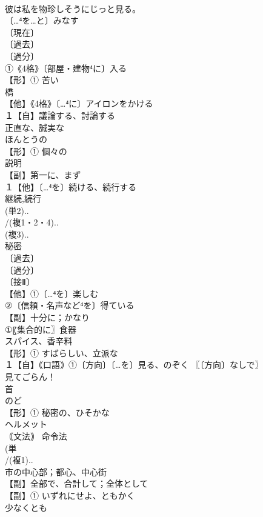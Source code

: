 \documentclass[8pt]{extreport}
\begin{document}
\begin{CJK}{UTF8}{min}
\\	彼は私を物珍しそうにじっと見る。 
\\	〔…⁴を…と〕みなす 
\\	〔現在〕
\\	〔過去〕
\\	〔過分〕
\\	①《4格》〔部屋・建物⁴に〕入る
\\	【形】① 苦い 
\\	橋 
\\	【他】《4格》〔…⁴に〕アイロンをかける 
\\	１【自】議論する、討論する 
\\	正直な、誠実な 
\\	ほんとうの
\\	【形】① 個々の 
\\	説明 
\\	【副】第一に、まず
\\	１【他】〔…⁴を〕続ける、続行する 
\\	継続,続行
\\	(単2)..
\\	/(複1・2・4)..
\\	(複3)..
\\	秘密 
\\	〔過去〕
\\	〔過分〕
\\	〔接Ⅱ〕
\\	【他】①〔…⁴を〕楽しむ 
\\	②〔信頼・名声など⁴を〕得ている
\\	【副】十分に；かなり 
\\	①〖集合的に〗食器
\\	スパイス、香辛料 
\\	【形】① すばらしい、立派な 
\\	１【自】｟口語｠①〔方向〕〔…を〕見る、のぞく 〖〔方向〕なしで〗
\\	見てごらん！
\\	首 
\\	のど 
\\	【形】① 秘密の、ひそかな 
\\	ヘルメット 
\\	｟文法｠ 命令法
\\	(単
\\	/(複1)..
\\	市の中心部；都心、中心街 
\\	【副】全部で、合計して；全体として 
\\	【副】① いずれにせよ、ともかく 
\\	少なくとも

\end{CJK}
\end{document}
